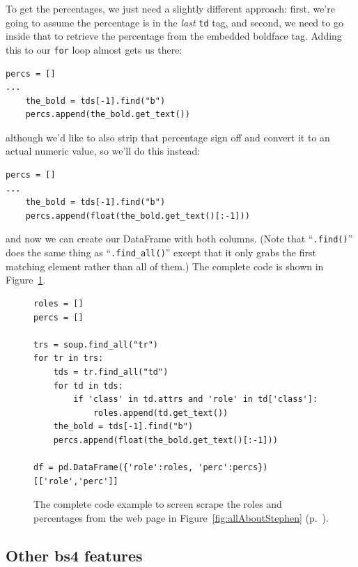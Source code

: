 To get the percentages, we just need a slightly different approach: first,
we're going to assume the percentage is in the \textit{last} \texttt{td} tag,
and second, we need to go inside that to retrieve the percentage from the
embedded boldface tag. Adding this to our \texttt{for} loop almost gets us
there:

\begin{Verbatim}[fontsize=\footnotesize,samepage=true,frame=single]
percs = []
...
    the_bold = tds[-1].find("b")
    percs.append(the_bold.get_text())
\end{Verbatim}

although we'd like to also strip that percentage sign off and convert it to an
actual numeric value, so we'll do this instead:

\begin{Verbatim}[fontsize=\footnotesize,samepage=true,frame=single]
percs = []
...
    the_bold = tds[-1].find("b")
    percs.append(float(the_bold.get_text()[:-1]))
\end{Verbatim}

and now we can create our DataFrame with both columns. (Note that
``\texttt{.find()}'' does the same thing as ``\texttt{.find\_all()}'' except
that it only grabs the first matching element rather than all of them.) The
complete code is shown in Figure~\ref{fig:getRolesComplete}.

\begin{figure}[ht]
\begin{Verbatim}[fontsize=\footnotesize,samepage=true,frame=single]
roles = []
percs = []

trs = soup.find_all("tr")
for tr in trs:
    tds = tr.find_all("td")
    for td in tds:
        if 'class' in td.attrs and 'role' in td['class']:
            roles.append(td.get_text())
    the_bold = tds[-1].find("b")
    percs.append(float(the_bold.get_text()[:-1]))

df = pd.DataFrame({'role':roles, 'perc':percs})[['role','perc']]
\end{Verbatim}
\caption{The complete code example to screen scrape the roles and percentages
from the web page in Figure~\ref{fig:allAboutStephen}
(p.~\pageref{fig:allAboutStephen}).}
\label{fig:getRolesComplete}
\end{figure}

\subsection{Other bs4 features}

